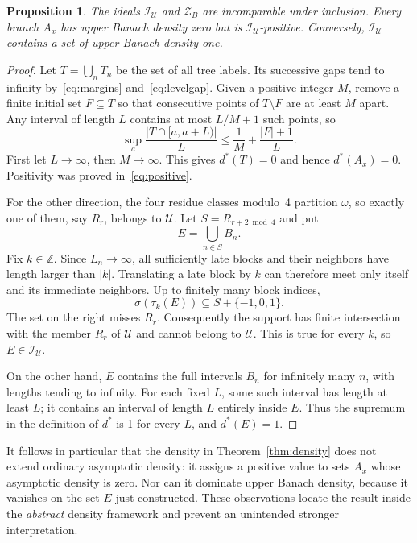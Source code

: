 \documentclass[11pt,a4paper]{article}
\newtheorem{proposition}[theorem]{Proposition}
\theoremstyle{definition}
\theoremstyle{remark}
\newcommand{\I}{\mathcal I}
\newcommand{\U}{\mathcal U}
\newcommand{\supp}{\sigma}
\newcommand{\sh}[2]{\tau_{#1}(#2)}
\begin{document}
\begin{proposition}
\label{prop:incomparable}
The ideals $\I_\U$ and $\mathcal Z_B$ are incomparable under inclusion.
Every branch $A_x$ has upper Banach density zero but is
$\I_\U$-positive. Conversely, $\I_\U$ contains a set of upper Banach
density one.
\end{proposition}
\begin{proof}
Let $T=\bigcup_n T_n$ be the set of all tree labels. Its successive gaps
tend to infinity by~\eqref{eq:margins} and~\eqref{eq:levelgap}. Given a
positive integer $M$, remove a finite initial set $F\subseteq T$ so
that consecutive points of $T\setminus F$ are at least $M$ apart.
Any interval of length $L$ contains at most $L/M+1$ such points, so
\[
       \sup_a\frac{|T\cap[a,a+L)|}{L}
                       \le\frac1M+\frac{|F|+1}{L}.
\]
First let $L\to\infty$, then $M\to\infty$. This gives $d^*(T)=0$ and
hence $d^*(A_x)=0$. Positivity was proved in~\eqref{eq:positive}.

For the other direction, the four residue classes modulo~4 partition
$\omega$, so exactly one of them, say $R_r$, belongs to $\U$. Let
$S=R_{r+2\bmod4}$ and put
\[
                         E=\bigcup_{n\in S}B_n.
\]
Fix $k\in\mathbb Z$. Since $L_n\to\infty$, all sufficiently late
blocks and their neighbors have length larger than $|k|$.
Translating a late block by $k$ can therefore meet only itself and its
immediate neighbors. Up to finitely many block indices,
\[
                 \supp(\sh{k}{E})\subseteq S+\{-1,0,1\}.
\]
The set on the right misses $R_r$. Consequently the support has finite
intersection with the member $R_r$ of $\U$ and cannot belong to $\U$.
This is true for every $k$, so $E\in\I_\U$.

On the other hand, $E$ contains the full intervals $B_n$ for infinitely
many $n$, with lengths tending to infinity. For each fixed $L$, some
such interval has length at least $L$; it contains an interval of length
$L$ entirely inside $E$. Thus the supremum in the definition of $d^*$ is
1 for every $L$, and $d^*(E)=1$.
\end{proof}

It follows in particular that the density in
Theorem~\ref{thm:density} does not extend ordinary asymptotic density:
it assigns a positive value to sets $A_x$ whose asymptotic density is
zero. Nor can it dominate upper Banach density, because it vanishes on
the set $E$ just constructed. These observations locate the result
inside the \emph{abstract} density framework and prevent an unintended
stronger interpretation.
\end{document}
